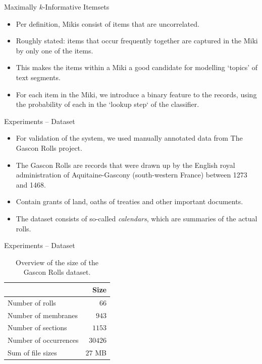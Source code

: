 \documentclass[12pt]{beamer}
\theoremstyle{break}
\begin{document}
\begin{frame}{Maximally $k$-Informative Itemsets}

	\begin{itemize}
		\item Per definition, Mikis consist of items that are \alert{uncorrelated}.
		\item Roughly stated: items that occur frequently together are captured in the Miki by only one of the items.
		\item This makes the items within a Miki a good candidate for modelling `topics' of text segments.
		\item For each item in the Miki, we introduce a binary feature to the records, using the probability of each in the `lookup step` of the classifier.
	\end{itemize}
	
\end{frame}




\begin{frame}{Experiments -- Dataset}
	
	\begin{itemize}
		\item For validation of the system, we used manually annotated data from The Gascon Rolls project.
		\item The Gascon Rolls are records that were drawn up by the English royal administration of Aquitaine-Gascony (south-western France) between 1273 and 1468.
		\item Contain grants of land, oaths of treaties and other important documents.
		\item The dataset consists of so-called \emph{calendars}, which are summaries of the actual rolls.
	\end{itemize}
	
\end{frame}




\begin{frame}{Experiments -- Dataset}

\begin{table}
    \centering
    \caption{Overview of the size of the Gascon Rolls dataset.}
    \label{tab:data_overview}
    \begin{tabular}{l r}
        \toprule
        & Size \\
        \midrule
        Number of rolls & $66$ \\
        Number of membranes & $943$ \\
        Number of sections & $1153$ \\
        Number of occurrences & $30426$ \\
        Sum of file sizes & $27$ MB \\
        \bottomrule
    \end{tabular}
\end{table}
	
\end{frame}
\end{document}
